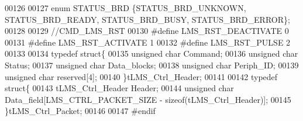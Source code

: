 \begin{DoxyCode}
00126 
00127 \textcolor{keyword}{enum} STATUS_BRD \{STATUS_BRD_UNKNOWN, STATUS_BRD_READY, STATUS_BRD_BUSY, 
      STATUS_BRD_ERROR\};
00128 
00129 \textcolor{comment}{//CMD\_LMS\_RST}
00130 \textcolor{preprocessor}{#define LMS\_RST\_DEACTIVATE  0}
00131 \textcolor{preprocessor}{#define LMS\_RST\_ACTIVATE    1}
00132 \textcolor{preprocessor}{#define LMS\_RST\_PULSE       2}
00133 
00134 \textcolor{keyword}{typedef} \textcolor{keyword}{struct}\{
00135     \textcolor{keywordtype}{unsigned} \textcolor{keywordtype}{char} Command;
00136     \textcolor{keywordtype}{unsigned} \textcolor{keywordtype}{char} Status;
00137     \textcolor{keywordtype}{unsigned} \textcolor{keywordtype}{char} Data_blocks;
00138     \textcolor{keywordtype}{unsigned} \textcolor{keywordtype}{char} Periph_ID;
00139     \textcolor{keywordtype}{unsigned} \textcolor{keywordtype}{char} reserved[4];
00140 \}tLMS_Ctrl_Header;
00141 
00142 \textcolor{keyword}{typedef} \textcolor{keyword}{struct}\{
00143     tLMS_Ctrl_Header Header;
00144     \textcolor{keywordtype}{unsigned} \textcolor{keywordtype}{char} Data\_field[LMS_CTRL_PACKET_SIZE - \textcolor{keyword}{sizeof}(tLMS_Ctrl_Header)];
00145 \}tLMS_Ctrl_Packet;
00146 
00147 \textcolor{preprocessor}{#endif}
\end{DoxyCode}
